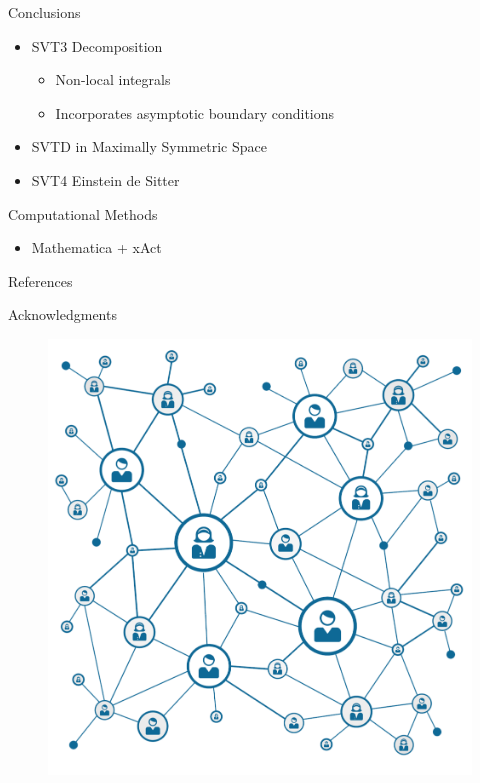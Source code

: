 \documentclass[8pt,aspectratio=1610]{beamer}
\begin{document}
\begin{frame}{Conclusions}
	\begin{itemize}
		\item SVT3 Decomposition
		\begin{itemize}
			\item Non-local integrals
			\item Incorporates asymptotic boundary conditions
		\end{itemize}
		\item SVTD in Maximally Symmetric Space
		\item SVT4 Einstein de Sitter
	\end{itemize}
\end{frame}


\begin{frame}{Computational Methods}
	\begin{itemize}
		\item Mathematica + xAct
	\end{itemize}
\end{frame}


\begin{frame}{References}
		
\end{frame}


\begin{frame}{Acknowledgments}
	\begin{figure}
		\includegraphics[width=0.35\linewidth]{network.png}
	\end{figure}
	\let\thefootnote\relax{}
\end{frame}
\end{document}
